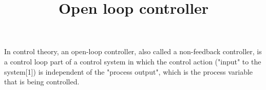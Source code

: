 \documentclass[a4paper]{article}
\title{Open loop controller}
\date{}
\begin{document}
\maketitle
    In control theory, an open-loop controller, also called a non-feedback controller, is a control loop part of a control system in which the control action ("input" to the system[1]) is independent of the "process output", which is the process variable that is being controlled. 
\end{document}

